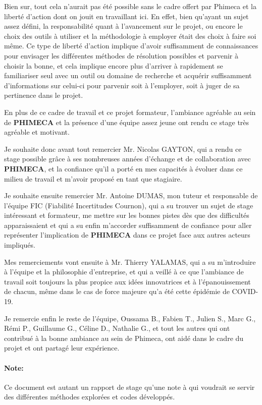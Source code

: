 \documentclass[a4paper,10pt]{article}
\begin{document}
Bien sur, tout cela n'aurait pas été possible sans le cadre offert par Phimeca et la liberté d'action dont on jouit en travaillant ici. En effet, bien qu'ayant un sujet assez défini, la responsabilité quant à l'avancement sur le projet, ou encore le choix des outils à utiliser et la méthodologie à employer était des choix à faire soi même. Ce type de liberté d'action implique d'avoir suffisamment de connaissances pour envisager les différentes méthodes de résolution possibles et parvenir à choisir la bonne, et cela implique encore plus d'arriver à rapidement se familiariser seul avec un outil ou domaine de recherche et acquérir suffisamment d'informations sur celui-ci pour parvenir soit à l'employer, soit à juger de sa pertinence dans le projet. \bigskip

En plus de ce cadre de travail et ce projet formateur, l'ambiance agréable au sein de \textbf{PHIMECA} et la présence d'une équipe assez jeune ont rendu ce stage très agréable et motivant.\bigskip

Je souhaite donc avant tout remercier Mr. Nicolas GAYTON, qui a rendu ce stage possible grâce à ses nombreuses années d'échange et de collaboration avec \textbf{PHIMECA}, et la confiance qu'il a porté en mes capacités à évoluer dans ce milieu de travail et m'avoir proposé en tant que stagiaire. \bigskip

Je souhaite ensuite remercier Mr. Antoine DUMAS, mon tuteur et responsable de l'équipe FIC (Fiabilité Incertitudes Cournon), qui a su trouver un sujet de stage intéressant et formateur, me mettre sur les bonnes pistes dès que des difficultés apparaissaient et qui a su enfin m'accorder suffisamment de confiance pour aller représenter l'implication de \textbf{PHIMECA} dans ce projet face aux autres acteurs impliqués. \bigskip

Mes remerciements vont ensuite à Mr. Thierry YALAMAS, qui a su m'introduire à l'équipe et la philosophie d'entreprise, et qui a veillé à ce que l'ambiance de travail soit toujours la plus propice aux idées innovatrices et à l'épanouissement de chacun, même dans le cas de force majeure qu'a été cette épidémie de COVID-19. \bigskip

Je remercie enfin le reste de l'équipe, Oussama B., Fabien T., Julien S., Marc G., Rémi P., Guillaume G., Céline D., Nathalie G., et tout les autres qui ont contribué à la bonne ambiance au sein de Phimeca, ont aidé dans le cadre du projet et ont partagé leur expérience. 

\paragraph{Note:}
Ce document est autant un rapport de stage qu'une note à qui voudrait se servir des différentes méthodes explorées et codes développés.
\end{document}
